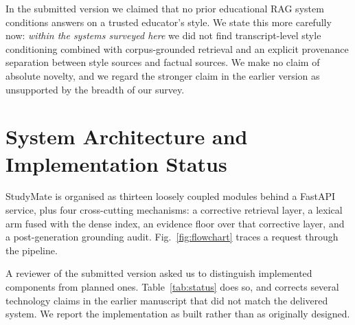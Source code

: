 \documentclass[conference]{IEEEtran}
\begin{document}
In the submitted version we claimed that no prior educational RAG system
conditions answers on a trusted educator's style. We state this more carefully
now: \emph{within the systems surveyed here} we did not find transcript-level
style conditioning combined with corpus-grounded retrieval and an explicit
provenance separation between style sources and factual sources. We make no
claim of absolute novelty, and we regard the stronger claim in the earlier
version as unsupported by the breadth of our survey.

\section{System Architecture and Implementation Status}
StudyMate is organised as thirteen loosely coupled modules behind a FastAPI
service, plus four cross-cutting mechanisms: a corrective retrieval layer, a
lexical arm fused with the dense index, an evidence floor over that corrective
layer, and a post-generation grounding audit.
Fig.~\ref{fig:flowchart} traces a request through the pipeline.

A reviewer of the submitted version asked us to distinguish implemented
components from planned ones. Table~\ref{tab:status} does so, and corrects
several technology claims in the earlier manuscript that did not match the
delivered system. We report the implementation as built rather than as
originally designed.
\end{document}
